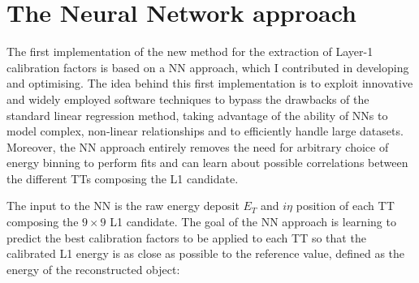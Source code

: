 


\section{The Neural Network approach}
\label{sec:The Neural Network approach}

The first implementation of the new method for the extraction of Layer-1 calibration factors is based on a NN approach, which I contributed in developing and optimising.
The idea behind this first implementation is to exploit innovative and widely employed software techniques to bypass the drawbacks of the standard linear regression method, taking advantage of the ability of NNs to model complex, non-linear relationships and to efficiently handle large datasets.
Moreover, the NN approach entirely removes the need for arbitrary choice of energy binning to perform fits and can learn about possible correlations between the different TTs composing the L1 candidate.

The input to the NN is the raw energy deposit $E_T$ and $i\eta$ position of each TT composing the $9\times9$ L1 candidate.
The goal of the NN approach is learning to predict the best calibration factors to be applied to each TT so that the calibrated L1 energy is as close as possible to the reference value, defined as the energy of the reconstructed object:

